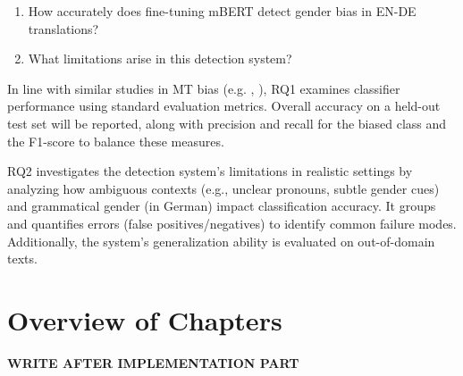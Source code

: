     \begin{enumerate}[label=\textbf{RQ\arabic*:}]
    \item How accurately does fine-tuning mBERT detect gender bias in EN-DE translations?
    \item What limitations arise in this detection system?
    \end{enumerate}

    In line with similar studies in MT bias (e.g. \textcite{smacchiaDoesAIReflect2024}, \textcite{rescignoGenderBiasMachine2023}), RQ1 examines classifier performance using standard evaluation metrics. Overall accuracy on a held-out test set will be reported, along with precision and recall for the biased class and the F1-score to balance these measures. 
    
    RQ2 investigates the detection system's limitations in realistic settings by analyzing how ambiguous contexts (e.g., unclear pronouns, subtle gender cues) and grammatical gender (in German) impact classification accuracy. It groups and quantifies errors (false positives/negatives) to identify common failure modes. Additionally, the system's generalization ability is evaluated on out-of-domain texts.

\section{Overview of Chapters}
\textbf{WRITE AFTER IMPLEMENTATION PART}
